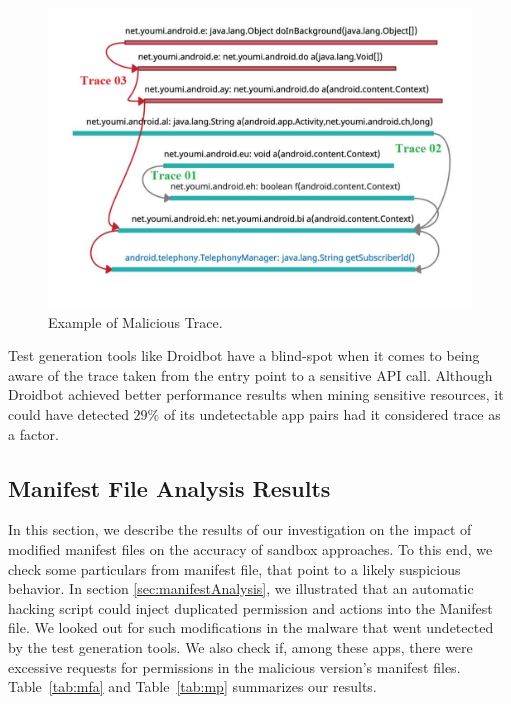\begin{figure}
\centering
\includegraphics[scale=0.30]{images/maliciousTrace_example01.pdf}
\caption{Example of Malicious Trace.}
 \label{fig:maliciousTrace}
\end{figure}

\begin{obs}{2}{}
 Test generation tools like Droidbot have a blind-spot when it comes to being aware of the trace taken from the entry point to a sensitive API call. Although Droidbot achieved better performance results when mining sensitive resources, it could have detected $29\%$ of its undetectable app pairs had it considered trace as a factor.
 \end{obs}

\subsection{Manifest File Analysis Results}\label{sec:manifestResults}

In this section, we describe the results of our investigation on the impact of modified manifest files on the accuracy of sandbox approaches. 
To this end, we check some particulars from manifest file, that point to a likely suspicious behavior. In section \ref{sec:manifestAnalysis}, we illustrated that an automatic hacking script could inject duplicated permission and actions into the Manifest file. We looked out for such modifications in the malware that went undetected by the test generation tools. We also check if, among these apps, there were excessive requests for permissions in the malicious version's manifest files. Table~\ref{tab:mfa} and Table~\ref{tab:mp} summarizes our results. 

